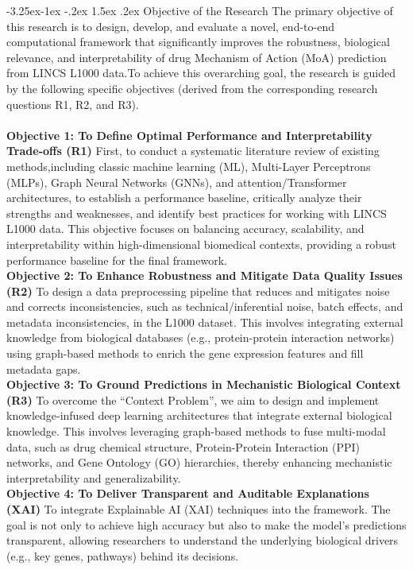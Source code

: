 \documentclass[12pt,a4paper]{article}
\makeatletter
\renewcommand\subsection{\@startsection{subsection}{2}{\z@}%
  {-3.25ex\@plus-1ex \@minus-.2ex}%
  {1.5ex \@plus.2ex}%
  {\normalfont\normalsize\bfseries}}
\makeatother
\begin{document}
\subsection{Objective of the Research}\label{subsec:Objective of the Research}
The primary objective of this research is to design, develop, and evaluate a novel, end-to-end computational framework that significantly improves the robustness, biological relevance, and interpretability of drug Mechanism of Action (MoA) prediction from LINCS L1000 data.To achieve this overarching goal, the research is guided by the following specific objectives (derived from the corresponding research questions R1, R2, and R3).
\\ 
\\
\textbf{Objective 1: To Define Optimal Performance and Interpretability Trade-offs (R1)} First, to conduct a systematic literature review of existing methods,including classic machine learning (ML), Multi-Layer Perceptrons (MLPs), Graph Neural Networks (GNNs), and attention/Transformer architectures, to establish a performance baseline, critically analyze their strengths and weaknesses, and identify best practices for working with LINCS L1000 data. This objective focuses on balancing accuracy, scalability, and interpretability within high-dimensional biomedical contexts, providing a robust performance baseline for the final framework.
\\
\textbf{Objective 2: To Enhance Robustness and Mitigate Data Quality Issues (R2)} To design a data preprocessing pipeline that reduces and mitigates noise and corrects inconsistencies, such as technical/inferential noise, batch effects, and metadata inconsistencies, in the L1000 dataset. This involves integrating external knowledge from biological databases (e.g., protein-protein interaction networks) using graph-based methods to enrich the gene expression features and fill metadata gaps.
\\
\textbf{Objective 3: To Ground Predictions in Mechanistic Biological Context (R3)} To overcome the \enquote{Context Problem}, we aim to design and implement knowledge-infused deep learning architectures that integrate external biological knowledge. This involves leveraging graph-based methods to fuse multi-modal data, such as drug chemical structure, Protein-Protein Interaction (PPI) networks, and Gene Ontology (GO) hierarchies, thereby enhancing mechanistic interpretability and generalizability.
\\
\textbf{Objective 4: To Deliver Transparent and Auditable Explanations (XAI)} To integrate Explainable AI (XAI) techniques into the framework. The goal is not only to achieve high accuracy but also to make the model’s predictions transparent, allowing researchers to understand the underlying biological drivers (e.g., key genes, pathways) behind its decisions.
\end{document}
